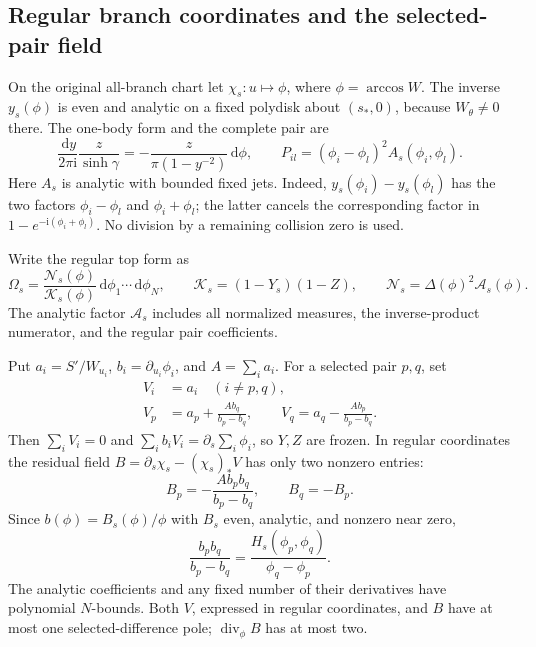 \documentclass[11pt]{article}
\numberwithin{equation}{section}
\theoremstyle{definition}
\newcommand{\dd}{\,\mathrm d}
\newcommand{\ii}{\mathrm i}
\begin{document}
\subsection{Regular branch coordinates and the selected-pair field}
On the original all-branch chart let \(\chi_s:u\mapsto\phi\), where
\(\phi=\arccos W\). The inverse \(y_s(\phi)\) is even and analytic
on a fixed polydisk about \((s_*,0)\), because \(W_\theta\ne0\) there.
The one-body form and the complete pair are
\begin{equation}
 \frac{\dd y}{2\pi\ii}\frac{z}{\sinh\gamma}
   =-\frac{z}{\pi(1-y^{-2})}\dd\phi,\qquad
 P_{il}=(\phi_i-\phi_l)^2 A_s(\phi_i,\phi_l).
 \label{eq:branchregular}
\end{equation}
Here \(A_s\) is analytic with bounded fixed jets. Indeed,
\(y_s(\phi_i)-y_s(\phi_l)\) has the two factors
\(\phi_i-\phi_l\) and \(\phi_i+\phi_l\); the latter cancels the
corresponding factor in \(1-e^{-\ii(\phi_i+\phi_l)}\).
No division by a remaining collision zero is used.

Write the regular top form as
\[
 \Omega_s=
  \frac{\mathscr N_s(\phi)}{\mathcal K_s(\phi)}
       \dd\phi_1\cdots\dd\phi_N,\qquad
 \mathcal K_s=(1-Y_s)(1-Z),\qquad
 \mathscr N_s=\Delta(\phi)^2\mathscr A_s(\phi).
\]
The analytic factor \(\mathscr A_s\) includes all normalized measures,
the inverse-product numerator, and the regular pair coefficients.

Put \(a_i=S'/W_{u_i}\), \(b_i=\partial_{u_i}\phi_i\), and
\(A=\sum_i a_i\). For a selected pair \(p,q\), set
\begin{equation}
 \begin{split}
 V_i&=a_i\quad(i\ne p,q),\\
 V_p&=a_p+\frac{Ab_q}{b_p-b_q},\qquad
 V_q=a_q-\frac{Ab_p}{b_p-b_q}.
 \end{split}\label{eq:twofield}
\end{equation}
Then \(\sum_iV_i=0\) and
\(\sum_i b_iV_i=\partial_s\sum_i\phi_i\), so \(Y,Z\) are frozen.
In regular coordinates the residual field
\(B=\partial_s\chi_s-(\chi_s)_*V\) has only two nonzero entries:
\[
 B_p=-\frac{Ab_pb_q}{b_p-b_q},\qquad B_q=-B_p.
\]
Since \(b(\phi)=B_s(\phi)/\phi\) with \(B_s\) even, analytic, and
nonzero near zero,
\[
 \frac{b_pb_q}{b_p-b_q}
     =\frac{H_s(\phi_p,\phi_q)}{\phi_q-\phi_p}.
\]
The analytic coefficients and any fixed number of their derivatives
have polynomial \(N\)-bounds. Both \(V\), expressed in regular
coordinates, and \(B\) have at most one selected-difference pole;
\(\operatorname{div}_\phi B\) has at most two.
\end{document}
